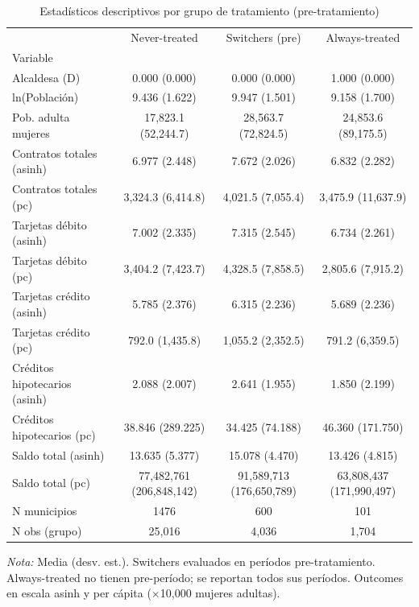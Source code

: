 \begin{table}[htbp]
\centering
\small
\caption{Estadísticos descriptivos por grupo de tratamiento (pre-tratamiento)}
\label{tab:descriptives}
\begin{tabular}{lccc}
\toprule
 & Never-treated & Switchers (pre) & Always-treated \\
Variable &  &  &  \\
\midrule
Alcaldesa (D) & 0.000 (0.000) & 0.000 (0.000) & 1.000 (0.000) \\
ln(Población) & 9.436 (1.622) & 9.947 (1.501) & 9.158 (1.700) \\
Pob. adulta mujeres & 17,823.1 (52,244.7) & 28,563.7 (72,824.5) & 24,853.6 (89,175.5) \\
Contratos totales (asinh) & 6.977 (2.448) & 7.672 (2.026) & 6.832 (2.282) \\
Contratos totales (pc) & 3,324.3 (6,414.8) & 4,021.5 (7,055.4) & 3,475.9 (11,637.9) \\
Tarjetas débito (asinh) & 7.002 (2.335) & 7.315 (2.545) & 6.734 (2.261) \\
Tarjetas débito (pc) & 3,404.2 (7,423.7) & 4,328.5 (7,858.5) & 2,805.6 (7,915.2) \\
Tarjetas crédito (asinh) & 5.785 (2.376) & 6.315 (2.236) & 5.689 (2.236) \\
Tarjetas crédito (pc) & 792.0 (1,435.8) & 1,055.2 (2,352.5) & 791.2 (6,359.5) \\
Créditos hipotecarios (asinh) & 2.088 (2.007) & 2.641 (1.955) & 1.850 (2.199) \\
Créditos hipotecarios (pc) & 38.846 (289.225) & 34.425 (74.188) & 46.360 (171.750) \\
Saldo total (asinh) & 13.635 (5.377) & 15.078 (4.470) & 13.426 (4.815) \\
Saldo total (pc) & 77,482,761 (206,848,142) & 91,589,713 (176,650,789) & 63,808,437 (171,990,497) \\
N municipios & 1476 & 600 & 101 \\
N obs (grupo) & 25,016 & 4,036 & 1,704 \\
\bottomrule
\end{tabular}
\vspace{2mm}
\parbox{\textwidth}{\footnotesize \textit{Nota:} Media (desv. est.). Switchers evaluados en períodos pre-tratamiento. Always-treated no tienen pre-período; se reportan todos sus períodos. Outcomes en escala asinh y per cápita (×10,000 mujeres adultas).}
\end{table}
